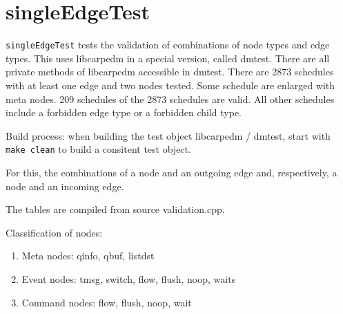 \section{singleEdgeTest}
\texttt{singleEdgeTest} tests the validation of combinations of node types and edge types. This uses libcarpedm in a special version, called dmtest.
There are all private methods of libcarpedm accessible in dmtest. There are 2873 schedules
with at least one edge and two nodes tested. Some schedule are enlarged with meta nodes. 209 schedules of the 2873 schedules are valid.
All other schedules include a forbidden edge type or a forbidden child type.

Build process: when building the test object libcarpedm / dmtest, start with \texttt{make clean} to build a consitent test object.

For this, the combinations of a node and an outgoing edge and,
respectively, a node and an incoming edge.

The tables are compiled from source validation.cpp.

Classification of nodes:
\begin{enumerate}
\item Meta nodes: qinfo, qbuf, listdst
\item Event nodes: tmsg, switch, flow, flush, noop, waits
\item Command nodes: flow, flush, noop, wait
\end{enumerate}

